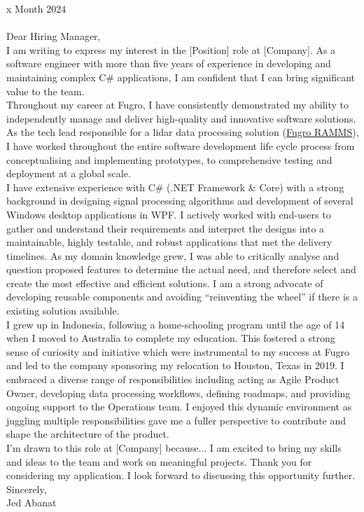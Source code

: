 \documentclass[10pt,letterpaper]{article}
\begin{document}


\vspace{30pt}

x Month 2024 \\ \\

Dear Hiring Manager, \\

I am writing to express my interest in the [Position] role at [Company]. As a software engineer with more than five years of experience in developing and maintaining complex C\# applications, I am confident that I can bring significant value to the team. \\

Throughout my career at Fugro, I have consistently demonstrated my ability to independently manage and deliver high-quality and innovative software solutions. As the tech lead responsible for a lidar data processing solution (\href{https://www.youtube.com/watch?v=f65bdm4tous}{\underline{Fugro RAMMS}}), I have worked throughout the entire software development life cycle process from conceptualising and implementing prototypes, to comprehensive testing and deployment at a global scale. \\

I have extensive experience with C\# (.NET Framework \& Core) with a strong background in designing signal processing algorithms and development of several Windows desktop applications in WPF. I actively worked with end-users to gather and understand their requirements and interpret the designs into a maintainable, highly testable, and robust applications that met the delivery timelines. As my domain knowledge grew, I was able to critically analyse and question proposed features to determine the actual need, and therefore select and create the most effective and efficient solutions. I am a strong advocate of developing reusable components and avoiding “reinventing the wheel” if there is a existing solution available. \\

I grew up in Indonesia, following a home-schooling program until the age of 14 when I moved to Australia to complete my education. This fostered a strong sense of curiosity and initiative which were instrumental to my success at Fugro and led to the company sponsoring my relocation to Houston, Texas in 2019. I embraced a diverse range of responsibilities including acting as Agile Product Owner, developing data processing workflows, defining roadmaps, and providing ongoing support to the Operations team. I enjoyed this dynamic environment as juggling multiple responsibilities gave me a fuller perspective to contribute and shape the architecture of the product. \\

I’m drawn to this role at [Company] because... I am excited to bring my skills and ideas to the team and work on meaningful projects.  Thank you for considering my application. I look forward to discussing this opportunity further. \\

Sincerely,\\
Jed Abanat
\end{document}
